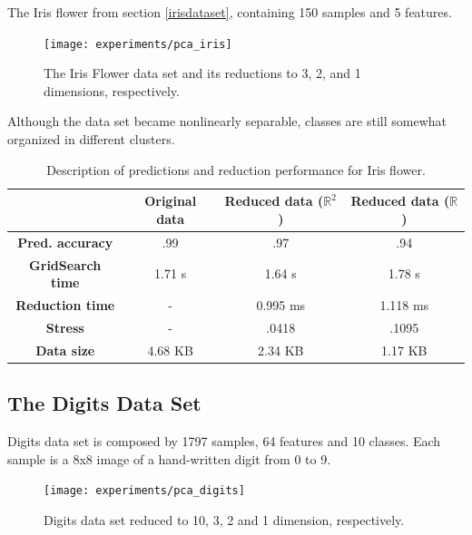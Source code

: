 The Iris flower from section \ref{irisdataset}, containing 150 samples and 5 features.

\begin{figure}[H]
	\centering
	\captionsetup{justification=centering}
	
	\texttt{[image: experiments/pca\_iris]}
	\caption{The Iris Flower data set and its reductions to 3, 2, and 1 dimensions, respectively.}
	\label{fig:dsirispca}
\end{figure}

Although the data set became nonlinearly separable, classes are still somewhat organized in different clusters.

\begin{table}[H]
	\centering
	
	\begin{tabular}{|c|c|c|c|}
		\hline
		& \textbf{Original data} & \textbf{Reduced data ($\mathbb{R}^2$)} & \textbf{Reduced data ($\mathbb{R}$)} \\\hline
		\textbf{Pred. accuracy} & .99 & .97 & .94 \\\hline
		\textbf{GridSearch time} & 1.71 s & 1.64 s & 1.78 s \\\hline
		\textbf{Reduction time} & - & 0.995 ms & 1.118 ms \\\hline
		\textbf{Stress} & - & .0418 & .1095 \\\hline
		\textbf{Data size} & 4.68 KB & 2.34 KB & 1.17 KB \\\hline
	\end{tabular}
	
	\caption{Description of predictions and reduction performance for Iris flower.}
\end{table}

\clearpage
\subsection{The Digits Data Set}

Digits data set is composed by 1797 samples, 64 features and 10 classes. Each sample is a 8x8 image of a hand-written digit from 0 to 9.

\begin{figure}[H]
	\centering
	\captionsetup{justification=centering}
	\texttt{[image: experiments/pca\_digits]}
	\caption{Digits data set reduced to 10, 3, 2 and 1 dimension, respectively.}
	\label{fig:dsdigitspca}
\end{figure}

